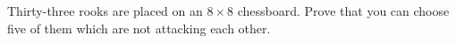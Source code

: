 Thirty-three rooks are placed on an $8 \times 8$ chessboard. Prove that you can choose five of them which are not attacking each other.
